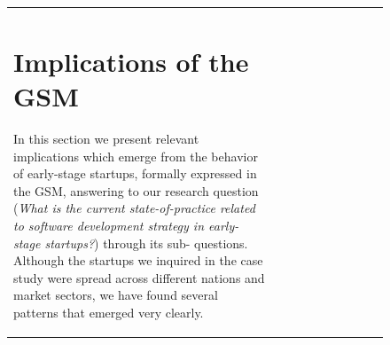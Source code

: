 \documentclass[12pt,journal,compsoc]{../sty/IEEEtran}
\begin{document}
\begin{table}[!t]
\begin{figure}[!t]
\begin{compactitem}
\begin{table}[!t]
\begin{tabular}{|l||c||c||c||c||c||c||c||c||c|}
\section{Implications of the GSM} %
\label{sect:theory:impl}



In this section we present relevant implications which  emerge from the behavior
of early-stage startups, formally expressed in the GSM,  answering to our
research question (\textit{What is the current  state-of-practice related to
software development strategy in early-stage  startups?}) through its sub-
questions. Although the startups we inquired in the  case study were spread
across different nations and market sectors, we have  found several patterns
that emerged very clearly.


\end{tabular}
\end{table}
\end{compactitem}
\end{figure}
\end{table}
\end{document}
